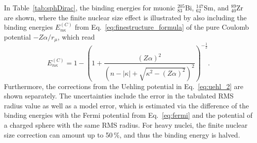 In Table~\ref{tab:sphDirac}, the binding energies for muonic $^{205}_{83}$Bi, $^{147}_{62}$Sm, and $^{89}_{40}$Zr are shown, where the finite nuclear size effect is illustrated by also including the binding energies $E^{(C)}_{n\kappa}$ from Eq.~\eqref{eq:finestructure_formula} of the pure Coulomb potential $-Z\alpha / r_\mu$, which read~\cite{greiner2000}
\begin{equation}
\label{eq:finestructure_formula_2}
E^{(C)}_{n\kappa}=1-\left(1+\frac{(Z\alpha)^2}{\left( n-|\kappa|+\sqrt{\kappa^2-(Z\alpha)^2} \right)^2}\right)^{-\frac{1}{2}}.
\end{equation}
Furthermore, the corrections from the Uehling potential in Eq.~\eqref{eq:uehl_2} are shown separately.
The uncertainties include the error in the tabulated RMS radius value as well as a model error, which is estimated via the difference of the binding energies with the Fermi potential from Eq.~\eqref{eq:fermi} and the potential of a charged sphere with the same RMS radius. For heavy nuclei, the finite nuclear size correction can amount up to 50$\,\%$, and thus the binding energy is halved.

